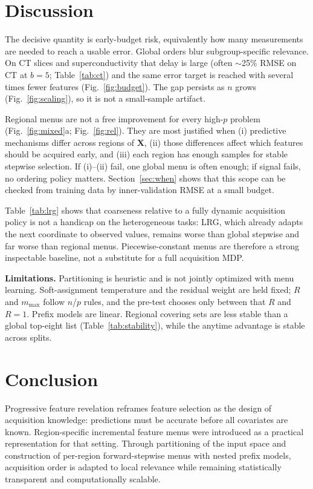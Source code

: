 \documentclass[pdflatex,sn-basic,Numbered]{sn-jnl}
\begin{document}
\section{Discussion}
\label{sec:discussion}

The decisive quantity is early-budget risk, equivalently how many measurements are needed to reach a usable error. Global orders blur subgroup-specific relevance. On CT slices and superconductivity that delay is large (often \(\sim\)25\% RMSE on CT at \(b=5\); Table~\ref{tab:ct}) and the same error target is reached with several times fewer features (Fig.~\ref{fig:budget}). The gap persists as \(n\) grows (Fig.~\ref{fig:scaling}), so it is not a small-sample artifact.

Regional menus are not a free improvement for every high-\(p\) problem (Fig.~\ref{fig:mixed}a; Fig.~\ref{fig:rel}). They are most justified when (i) predictive mechanisms differ across regions of \(\mathbf{X}\), (ii) those differences affect which features should be acquired early, and (iii) each region has enough samples for stable stepwise selection. If (i)--(ii) fail, one global menu is often enough; if signal fails, no ordering policy matters. Section~\ref{sec:when} shows that this scope can be checked from training data by inner-validation RMSE at a small budget.

Table~\ref{tab:lrg} shows that coarseness relative to a fully dynamic acquisition policy \cite{ma2019,covert2023} is not a handicap on the heterogeneous tasks: LRG, which already adapts the next coordinate to observed values, remains worse than global stepwise and far worse than regional menus. Piecewise-constant menus are therefore a strong inspectable baseline, not a substitute for a full acquisition MDP.

\textbf{Limitations.} Partitioning is heuristic and is not jointly optimized with menu learning. Soft-assignment temperature and the residual weight are held fixed; \(R\) and \(m_{\max}\) follow \(n\)/\(p\) rules, and the pre-test chooses only between that \(R\) and \(R=1\). Prefix models are linear. Regional covering sets are less stable than a global top-eight list (Table~\ref{tab:stability}), while the anytime advantage is stable across splits.

\section{Conclusion}
\label{sec:conclusion}

Progressive feature revelation reframes feature selection as the design of acquisition knowledge: predictions must be accurate before all covariates are known. Region-specific incremental feature menus were introduced as a practical representation for that setting. Through partitioning of the input space and construction of per-region forward-stepwise menus with nested prefix models, acquisition order is adapted to local relevance while remaining statistically transparent and computationally scalable.
\end{document}
